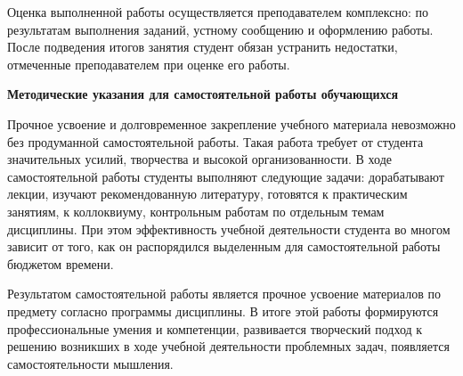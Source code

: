 \documentclass[a4paper, 12pt]{article}
\begin{document}
Оценка выполненной работы осуществляется преподавателем комплексно: по результатам выполнения заданий, устному сообщению и оформлению работы. После подведения итогов занятия студент обязан устранить недостатки, отмеченные преподавателем при оценке его работы.

\vspace{8pt}
{\bf Методические указания для самостоятельной работы обучающихся}

Прочное усвоение и долговременное закрепление учебного материала невозможно без продуманной самостоятельной работы. Такая работа требует от студента значительных усилий, творчества и высокой организованности. В ходе самостоятельной работы студенты выполняют следующие задачи: дорабатывают лекции, изучают рекомендованную литературу, готовятся к практическим занятиям, к коллоквиуму, контрольным работам по отдельным темам дисциплины. При этом эффективность учебной деятельности студента во многом зависит от того, как он распорядился выделенным для самостоятельной работы бюджетом времени.

Результатом самостоятельной работы является прочное усвоение материалов по предмету согласно программы дисциплины. В итоге этой работы формируются профессиональные умения и компетенции, развивается творческий подход к решению возникших в ходе учебной деятельности проблемных задач, появляется самостоятельности мышления.
\end{document}
